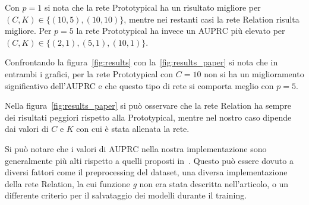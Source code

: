 \documentclass[12pt,a4paper,titlepage]{article}
\begin{document}
Con $p = 1$ si nota che la rete Prototypical ha un risultato migliore per $(C, K) \in \{ (10, 5), (10, 10)\}$, mentre nei restanti casi la rete Relation risulta migliore. Per $p = 5$ la rete Prototypical ha invece un AUPRC più elevato per $(C, K) \in \{ (2, 1), (5, 1), (10, 1)\}$.

Confrontando la figura~\ref{fig:results} con la~\ref{fig:results_paper} si nota che in entrambi i grafici, per la rete Prototypical con $C = 10$ non si ha un miglioramento significativo dell'AUPRC e che questo tipo di rete si comporta meglio con $p = 5$.

Nella figura~\ref{fig:results_paper} si può osservare che la rete Relation ha sempre dei risultati peggiori rispetto alla Prototypical, mentre nel nostro caso dipende dai valori di $C$ e $K$ con cui è stata allenata la rete. 

Si può notare che i valori di AUPRC nella nostra implementazione sono generalmente più alti rispetto a quelli proposti in~\cite{salamon:Few-Shot}. Questo può essere dovuto a diversi fattori come il preprocessing del dataset, una diversa implementazione della rete Relation, la cui funzione \textit{g} non era stata descritta nell'articolo, o un differente criterio per il salvataggio dei modelli durante il training.

\clearpage

\nocite{*}
\printbibliography
\end{document}
